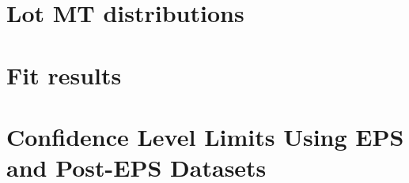 \documentclass{cmspaper}
\begin{document}
\clearpage
  \section{Lot MT distributions}
     \label{app:appendix_lowmt}
     
 
\clearpage
  \section{Fit results}
     \label{app:appendix_fit}
     

\clearpage
  \section{Confidence Level Limits Using EPS and Post-EPS Datasets}
     \label{app:limits_eps}
     

%  
\end{document}

